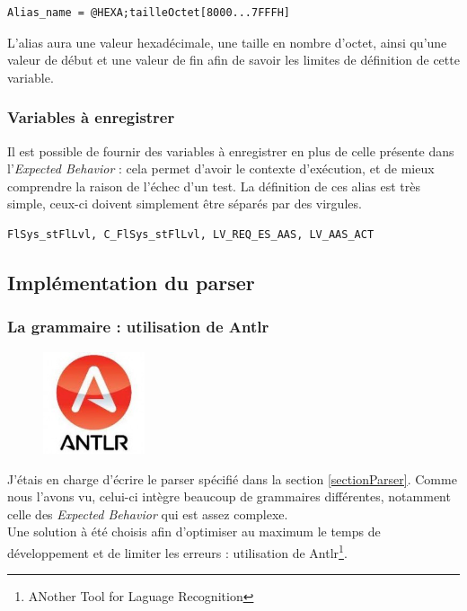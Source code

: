 \begin{lstlisting}[caption=Exemple de définition d'alias local, language=Algo]
Alias_name = @HEXA;tailleOctet[8000...7FFFH]
\end{lstlisting}
L'alias aura une valeur hexadécimale, une taille en nombre d'octet, ainsi qu'une valeur de début et une valeur de fin afin de savoir les limites de définition de cette variable.

\subsubsection{Variables à enregistrer}
Il est possible de fournir des variables à enregistrer en plus de celle présente dans l'\textit{Expected Behavior} : cela permet d'avoir le contexte d'exécution, et de mieux comprendre la raison de l'échec d'un test. La définition de ces alias est très simple, ceux-ci doivent simplement être séparés par des virgules.

\begin{lstlisting}[caption=Exemple de définition d'alias à enregistrer, language=Algo]
FlSys_stFlLvl, C_FlSys_stFlLvl, LV_REQ_ES_AAS, LV_AAS_ACT
\end{lstlisting}

	\subsection{Implémentation du parser}
		\subsubsection{La grammaire : utilisation de Antlr}
		\begin{figure}
			\includegraphics[width=3cm]{contents/images/antlr.jpg}
		\end{figure}
		J'étais en charge d'écrire le parser spécifié dans la section \ref{sectionParser}. Comme nous l'avons vu, celui-ci intègre beaucoup de grammaires différentes, notamment celle des \textit{Expected Behavior} qui est assez complexe. \\
		Une solution à été choisis afin d'optimiser au maximum le temps de développement et de limiter les erreurs : utilisation de Antlr\footnote{ANother Tool for Laguage Recognition}.

